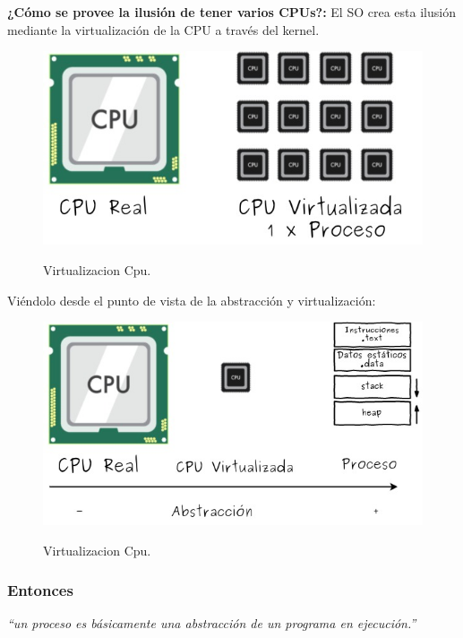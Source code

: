 \documentclass[../main.tex]{subfiles}
\begin{document}
        \textbf{¿Cómo se provee la ilusión de tener varios CPUs?:} El SO crea esta ilusión mediante la virtualización de la CPU a través del kernel.

        \begin{figure}[ht]
            \centering
            \includegraphics[scale=0.4]{../images/virtualizacionCpu.jpg}
            \label{fig:virtualizacionCpu}
            \caption{Virtualizacion Cpu.}
        \end{figure}

        Viéndolo desde el punto de vista de la abstracción y virtualización:

        \begin{figure}[ht]
            \centering
            \includegraphics[scale=0.4]{../images/cpuvirtualizacion.jpg}
            \label{fig:cpuvirtualizacion}
            \caption{Virtualizacion Cpu.}
        \end{figure}

    \subsubsection*{Entonces}
        \textit{“un proceso es básicamente una abstracción de un programa en ejecución.”}\\
\end{document}
